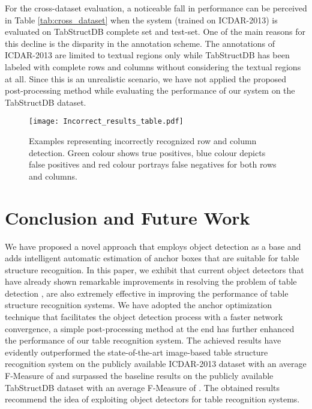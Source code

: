 \documentclass{ieeeaccess}
\begin{document}
For the cross-dataset evaluation, a noticeable fall in performance can be perceived in Table \ref{tab:cross_dataset} when the system (trained on ICDAR-2013) is evaluated on TabStructDB complete set and test-set. One of the main reasons for this decline is the disparity in the annotation scheme. The annotations of ICDAR-2013 are limited to textual regions only while TabStructDB has been labeled with complete rows and columns without considering the textual regions at all. Since this is an unrealistic scenario, we have not applied the proposed post-processing method while evaluating the performance of our system on the TabStructDB dataset.






\begin{figure*}[ht]
    \texttt{[image: Incorrect\_results\_table.pdf]}
    \caption{Examples representing incorrectly recognized row and column detection. Green colour shows true positives, blue colour depicts false positives and red colour portrays false negatives for both rows and columns.}
    \label{fig:incorrect_result_rows}
\end{figure*}


\section{Conclusion and Future Work}
\label{sec:conclusion}
We have proposed a novel approach that employs object detection as a base and adds intelligent automatic estimation of anchor boxes that are suitable for table structure recognition. In this paper, we exhibit that current object detectors that have already shown remarkable improvements in resolving the problem of table detection \cite{b27,b41}, are also extremely effective in improving the performance of table structure recognition systems. We have adopted the anchor optimization technique that facilitates the object detection process with a faster network convergence, a simple post-processing method at the end has further enhanced the performance of our table recognition system. The achieved results have evidently outperformed the state-of-the-art image-based table structure recognition system on the publicly available ICDAR-2013 dataset with an average F-Measure of  and surpassed the baseline results on the publicly available TabStructDB dataset with an average F-Measure of . The obtained results recommend the idea of exploiting object detectors for table recognition systems.
\end{document}
